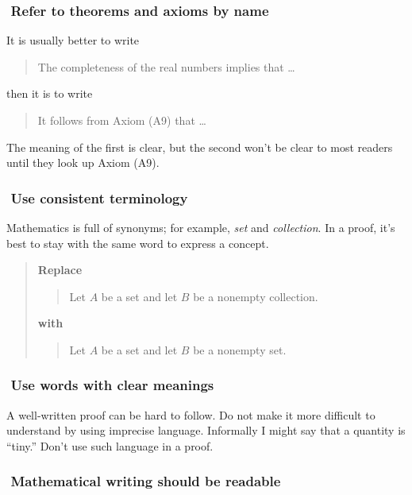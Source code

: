 \documentclass[12pt]{article}
\newcounter{ex}\setcounter{ex}{0}
\newcommand{\ex}{%
\hspace{-0.2in} \setcounter{ex}{\value{ex}+1}
\theex \,\,}
\newcounter{se}\setcounter{se}{0}
\begin{document}
\subsubsection*{\ex  Refer to theorems and axioms by name}  

It is usually better to write
\begin{quote}
The completeness of the real numbers implies that \dots
\end{quote}
then it is to write
\begin{quote}
 It follows from Axiom  (A9) that \dots
\end{quote}
The meaning of the first is clear, but the second won't be clear
to most readers until they look up Axiom (A9).

\subsubsection*{\ex  Use consistent terminology}

Mathematics is full of synonyms; for example, \emph{set} and 
\emph{collection}. In a proof, it's best to stay with the
same word to express a concept.

\begin{quote}
\textbf{Replace}
\begin{quote}
Let \(A\) be a set and let \(B\) be a nonempty collection.
\end{quote}
\textbf{with}
\begin{quote}
Let \(A\) be a set and let \(B\) be a nonempty set.
\end{quote}
\end{quote}


\subsubsection*{\ex  Use words with clear meanings}

A \mbox{well-written} proof can be hard to follow. Do not make it more
difficult to understand by using imprecise language.  Informally 
I might say that a quantity is ``tiny.'' Don't use such language in a proof.



\subsubsection*{\ex Mathematical writing should be readable}
\end{document}
